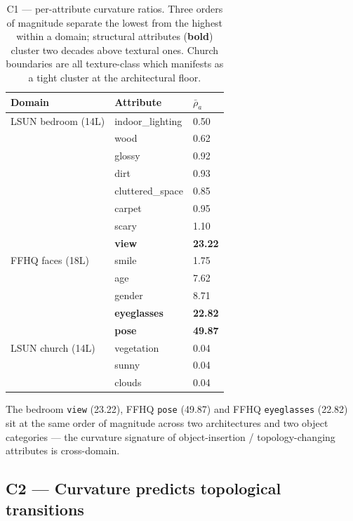 \begin{table}[t]
\centering
\small
\begin{tabular}{lll}
\toprule
Domain & Attribute & $\bar\rho_a$ \\
\midrule
LSUN bedroom (14L)   & indoor\_lighting & 0.50 \\
                     & wood             & 0.62 \\
                     & glossy           & 0.92 \\
                     & dirt             & 0.93 \\
                     & cluttered\_space & 0.85 \\
                     & carpet           & 0.95 \\
                     & scary            & 1.10 \\
                     & \textbf{view}    & \textbf{23.22} \\
\midrule
FFHQ faces (18L)     & smile            & 1.75 \\
                     & age              & 7.62 \\
                     & gender           & 8.71 \\
                     & \textbf{eyeglasses} & \textbf{22.82} \\
                     & \textbf{pose}    & \textbf{49.87} \\
\midrule
LSUN church (14L)    & vegetation       & 0.04 \\
                     & sunny            & 0.04 \\
                     & clouds           & 0.04 \\
\bottomrule
\end{tabular}
\caption{C1 --- per-attribute curvature ratios. Three orders of
magnitude separate the lowest from the highest within a domain;
structural attributes (\textbf{bold}) cluster two decades above
textural ones. Church boundaries are all texture-class which manifests
as a tight cluster at the architectural floor.}
\label{tab:c1-ratios}
\end{table}

The bedroom \texttt{view} (23.22), FFHQ \texttt{pose} (49.87) and
FFHQ \texttt{eyeglasses} (22.82) sit at the same order of magnitude
across two architectures and two object categories --- the curvature
signature of object-insertion / topology-changing attributes is
cross-domain.

\subsection{C2 --- Curvature predicts topological transitions}
\label{sec:exp-c2}

